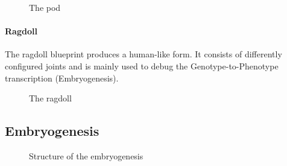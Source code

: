 \documentclass[main]{subfiles}
\begin{document}
\begin{figure}[!h]
\centering
{}
\caption[The pod]{The pod}
\label{figure:pod}
\end{figure}


\paragraph{Ragdoll}

The ragdoll blueprint produces a human-like form. It consists of differently configured joints and is mainly used to debug the Genotype-to-Phenotype transcription (Embryogenesis).

\begin{figure}[!h]
\centering
{}
\caption[The ragdoll]{The ragdoll}
\label{figure:ragdoll}
\end{figure}


\subsection{Embryogenesis}

\begin{figure}[!h]
\centering
{}
\caption[Structure of the embryogenesis]{Structure of the embryogenesis}
\label{figure:embryogenesis}
\end{figure}
\end{document}

